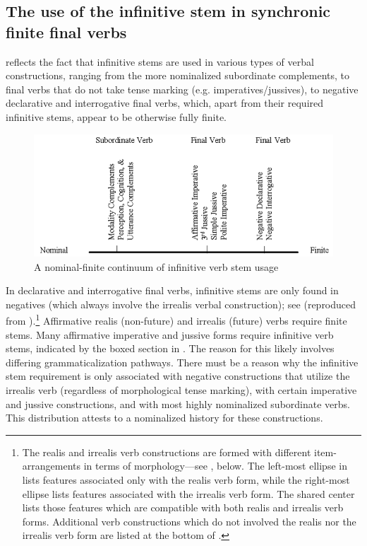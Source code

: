 \documentclass[output=paper]{langsci/langscibook}
\begin{document}
\subsection{The use of the infinitive stem in synchronic finite final verbs}\label{sec:mahland:3.1}

 reflects the fact that infinitive stems are used in various types of verbal constructions, ranging from the more nominalized subordinate complements, to final verbs that do not take tense marking (e.g. imperatives/jussives), to negative declarative and interrogative final verbs, which, apart from their required infinitive stems, appear to be otherwise fully finite. 

\begin{figure}
\includegraphics[width=\textwidth]{figures/MAhlandFig1.png}	
\caption{A nominal-finite continuum of infinitive verb stem usage}
\label{fig:1}
\end{figure}

In declarative and interrogative final verbs, infinitive stems are only found in negatives (which always involve the irrealis verbal construction); see  (reproduced from \citealt[266]{Ahland2012}).\footnote{The realis and irrealis verb constructions are formed with different item-arrangements in terms of morphology—see , below. The left-most ellipse in  lists features associated only with the realis verb form, while the right-most ellipse lists features associated with the irrealis verb form. The shared center lists those features which are compatible with both realis and irrealis verb forms. Additional verb constructions which do not involved the realis nor the irrealis verb form are listed at the bottom of .} Affirmative realis (non-future) and irrealis (future) verbs require finite stems. Many affirmative imperative and jussive forms require infinitive verb stems, indicated by the boxed section in . The reason for this likely involves differing grammaticalization pathways. There must be a reason why the infinitive stem requirement is only associated with negative constructions that utilize the irrealis verb (regardless of morphological tense marking), with certain imperative and jussive constructions, and with most highly nominalized subordinate verbs. This distribution attests to a nominalized history for these constructions. 
 
\end{document}
